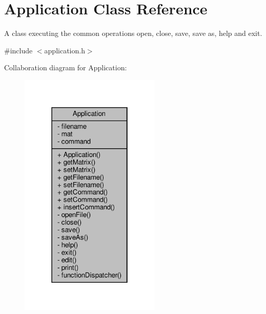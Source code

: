 \hypertarget{class_application}{}\section{Application Class Reference}
\label{class_application}


A class executing the common operations open, close, save, save as, help and exit.  




{\ttfamily \#include $<$application.\+h$>$}



Collaboration diagram for Application\+:
\nopagebreak
\begin{figure}[H]
\begin{center}
\leavevmode
\includegraphics[width=190pt]{class_application__coll__graph}
\end{center}
\end{figure}
